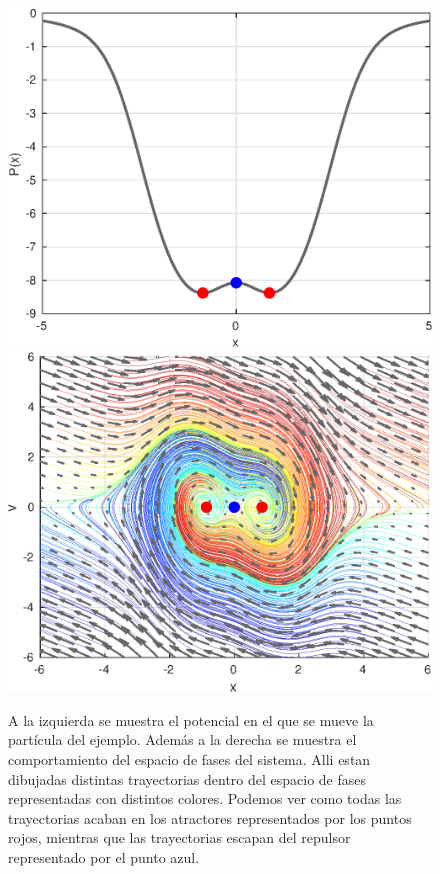\begin{example}
    \begin{figure}
        \centering
        \includegraphics[scale=0.5]{img/Potential.eps} 
        \includegraphics[scale=0.5]{img/pp_free.eps}
        \caption[Comportamiento de la partícula en un potencial]{
         A la izquierda se muestra el potencial en el que se mueve la partícula del ejemplo. Además a la derecha se muestra el comportamiento del espacio de fases del sistema. Alli estan dibujadas distintas trayectorias dentro del espacio de fases representadas con distintos colores. Podemos ver como todas las trayectorias acaban en los atractores representados por los puntos rojos, mientras que las trayectorias escapan del repulsor representado por el punto azul.}
        \label{fig:potencial}
    \end{figure}


\end{example}
